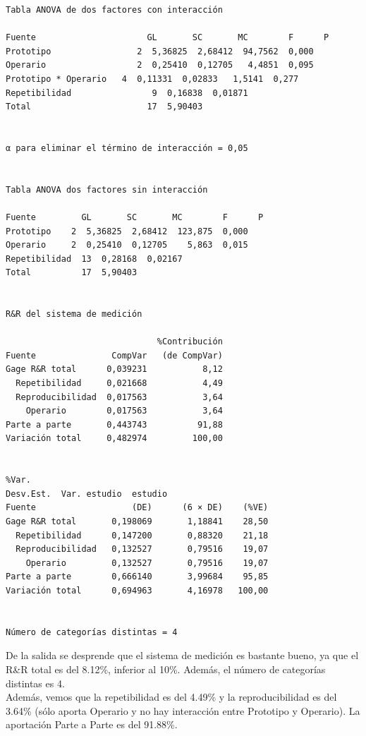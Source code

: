\documentclass[12pt,a4paper,twoside,openright,titlepage,final]{article}
\begin{document}
\begin{verbatim}
Tabla ANOVA de dos factores con interacción 

Fuente                      GL       SC       MC        F      P
Prototipo                 2  5,36825  2,68412  94,7562  0,000
Operario                  2  0,25410  0,12705   4,4851  0,095
Prototipo * Operario   4  0,11331  0,02833   1,5141  0,277
Repetibilidad                9  0,16838  0,01871
Total                       17  5,90403


α para eliminar el término de interacción = 0,05


Tabla ANOVA dos factores sin interacción 

Fuente         GL       SC       MC        F      P
Prototipo    2  5,36825  2,68412  123,875  0,000
Operario     2  0,25410  0,12705    5,863  0,015
Repetibilidad  13  0,28168  0,02167
Total          17  5,90403


R&R del sistema de medición 

                              %Contribución
Fuente               CompVar   (de CompVar)
Gage R&R total      0,039231           8,12
  Repetibilidad     0,021668           4,49
  Reproducibilidad  0,017563           3,64
    Operario        0,017563           3,64
Parte a parte       0,443743          91,88
Variación total     0,482974         100,00


%Var.
Desv.Est.  Var. estudio  estudio
Fuente                   (DE)      (6 × DE)    (%VE)
Gage R&R total       0,198069       1,18841    28,50
  Repetibilidad      0,147200       0,88320    21,18
  Reproducibilidad   0,132527       0,79516    19,07
    Operario         0,132527       0,79516    19,07
Parte a parte        0,666140       3,99684    95,85
Variación total      0,694963       4,16978   100,00


Número de categorías distintas = 4
\end{verbatim}

De la salida se desprende que el sistema de medición es bastante bueno, ya que el R\&R total es del 8.12\%, inferior al 10\%. Además, el número de categorías distintas es 4.\\

Además, vemos que la repetibilidad es del 4.49\% y la reproducibilidad es del 3.64\% (sólo aporta Operario y no hay interacción entre Prototipo y Operario). La aportación Parte a Parte es del 91.88\%.\\
\end{document}
